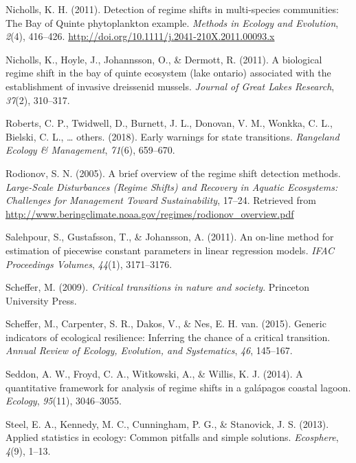\documentclass[12pt,twoside,openany]{reedthesis}
\begin{document}
\hypertarget{ref-nicholls_detection_2011}{}
Nicholls, K. H. (2011). Detection of regime shifts in multi-species
communities: The Bay of Quinte phytoplankton example. \emph{Methods in
Ecology and Evolution}, \emph{2}(4), 416--426.
\url{http://doi.org/10.1111/j.2041-210X.2011.00093.x}

\hypertarget{ref-nicholls2011biological}{}
Nicholls, K., Hoyle, J., Johannsson, O., \& Dermott, R. (2011). A
biological regime shift in the bay of quinte ecosystem (lake ontario)
associated with the establishment of invasive dreissenid mussels.
\emph{Journal of Great Lakes Research}, \emph{37}(2), 310--317.

\hypertarget{ref-roberts2018early}{}
Roberts, C. P., Twidwell, D., Burnett, J. L., Donovan, V. M., Wonkka, C.
L., Bielski, C. L., \ldots{} others. (2018). Early warnings for state
transitions. \emph{Rangeland Ecology \& Management}, \emph{71}(6),
659--670.

\hypertarget{ref-rodionov_brief_2005}{}
Rodionov, S. N. (2005). A brief overview of the regime shift detection
methods. \emph{Large-Scale Disturbances (Regime Shifts) and Recovery in
Aquatic Ecosystems: Challenges for Management Toward Sustainability},
17--24. Retrieved from
\url{http://www.beringclimate.noaa.gov/regimes/rodionov_overview.pdf}

\hypertarget{ref-salehpour2011line}{}
Salehpour, S., Gustafsson, T., \& Johansson, A. (2011). An on-line
method for estimation of piecewise constant parameters in linear
regression models. \emph{IFAC Proceedings Volumes}, \emph{44}(1),
3171--3176.

\hypertarget{ref-scheffer_critical_2009}{}
Scheffer, M. (2009). \emph{Critical transitions in nature and society}.
Princeton University Press.

\hypertarget{ref-scheffer2015generic}{}
Scheffer, M., Carpenter, S. R., Dakos, V., \& Nes, E. H. van. (2015).
Generic indicators of ecological resilience: Inferring the chance of a
critical transition. \emph{Annual Review of Ecology, Evolution, and
Systematics}, \emph{46}, 145--167.

\hypertarget{ref-seddon2014quantitative}{}
Seddon, A. W., Froyd, C. A., Witkowski, A., \& Willis, K. J. (2014). A
quantitative framework for analysis of regime shifts in a galápagos
coastal lagoon. \emph{Ecology}, \emph{95}(11), 3046--3055.

\hypertarget{ref-steel2013applied}{}
Steel, E. A., Kennedy, M. C., Cunningham, P. G., \& Stanovick, J. S.
(2013). Applied statistics in ecology: Common pitfalls and simple
solutions. \emph{Ecosphere}, \emph{4}(9), 1--13.
\end{document}
